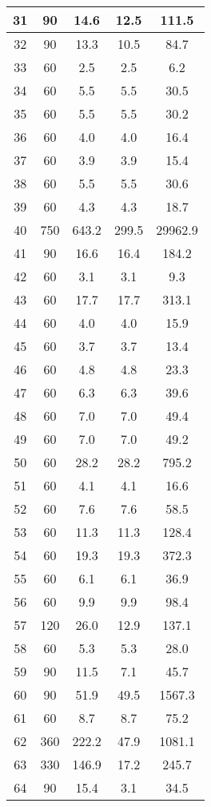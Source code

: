 \documentclass[a4paper,10pt]{article}
\begin{document}
\begin{table}
\begin{tabular}{|c|c|c|c|c|}
\hline
31 & 90 & 14.6 & 12.5 & 111.5 \\
\hline
32 & 90 & 13.3 & 10.5 & 84.7 \\
\hline
33 & 60 & 2.5 & 2.5 & 6.2 \\
\hline
34 & 60 & 5.5 & 5.5 & 30.5 \\
\hline
35 & 60 & 5.5 & 5.5 & 30.2 \\
\hline
36 & 60 & 4.0 & 4.0 & 16.4 \\
\hline
37 & 60 & 3.9 & 3.9 & 15.4 \\
\hline
38 & 60 & 5.5 & 5.5 & 30.6 \\
\hline
39 & 60 & 4.3 & 4.3 & 18.7 \\
\hline
40 & 750 & 643.2 & 299.5 & 29962.9 \\
\hline
41 & 90 & 16.6 & 16.4 & 184.2 \\
\hline
42 & 60 & 3.1 & 3.1 & 9.3 \\
\hline
43 & 60 & 17.7 & 17.7 & 313.1 \\
\hline
44 & 60 & 4.0 & 4.0 & 15.9 \\
\hline
45 & 60 & 3.7 & 3.7 & 13.4 \\
\hline
46 & 60 & 4.8 & 4.8 & 23.3 \\
\hline
47 & 60 & 6.3 & 6.3 & 39.6 \\
\hline
48 & 60 & 7.0 & 7.0 & 49.4 \\
\hline
49 & 60 & 7.0 & 7.0 & 49.2 \\
\hline
50 & 60 & 28.2 & 28.2 & 795.2 \\
\hline
51 & 60 & 4.1 & 4.1 & 16.6 \\
\hline
52 & 60 & 7.6 & 7.6 & 58.5 \\
\hline
53 & 60 & 11.3 & 11.3 & 128.4 \\
\hline
54 & 60 & 19.3 & 19.3 & 372.3 \\
\hline
55 & 60 & 6.1 & 6.1 & 36.9 \\
\hline
56 & 60 & 9.9 & 9.9 & 98.4 \\
\hline
57 & 120 & 26.0 & 12.9 & 137.1 \\
\hline
58 & 60 & 5.3 & 5.3 & 28.0 \\
\hline
59 & 90 & 11.5 & 7.1 & 45.7 \\
\hline
60 & 90 & 51.9 & 49.5 & 1567.3 \\
\hline
61 & 60 & 8.7 & 8.7 & 75.2 \\
\hline
62 & 360 & 222.2 & 47.9 & 1081.1 \\
\hline
63 & 330 & 146.9 & 17.2 & 245.7 \\
\hline
64 & 90 & 15.4 & 3.1 & 34.5 \\

\end{tabular}
\end{table}
\end{document}
